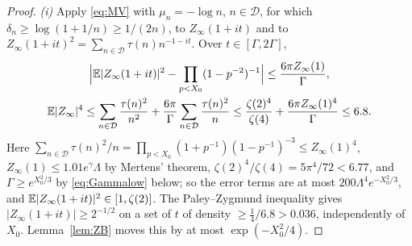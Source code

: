 \begin{proof}
\emph{(i)} Apply \eqref{eq:MV} with $\mu_n=-\log n$, $n\in\mathcal D$, for which $\delta_n\ge\log(1+1/n)\ge1/(2n)$, to $Z_\infty(1+it)$
and to $Z_\infty(1+it)^2=\sum_{n\in\mathcal D}\tau(n)n^{-1-it}$. Over $t\in[\Gamma,2\Gamma]$,
\[
\begin{gathered}
  \Bigl|\mathbb{E}|Z_\infty(1+it)|^2-\prod_{p<X_0}(1-p^{-2})^{-1}\Bigr|\le\frac{6\pi Z_\infty(1)}\Gamma,\\
  \mathbb{E}|Z_\infty|^4\le\sum_{n\in\mathcal D}\frac{\tau(n)^2}{n^2}+\frac{6\pi}\Gamma\sum_{n\in\mathcal D}\frac{\tau(n)^2}n
  \le\frac{\zeta(2)^4}{\zeta(4)}+\frac{6\pi Z_\infty(1)^4}\Gamma\le6.8.
\end{gathered}
\]
Here $\sum_{n\in\mathcal D}\tau(n)^2/n=\prod_{p<X_0}(1+p^{-1})(1-p^{-1})^{-3}\le Z_\infty(1)^4$, $Z_\infty(1)\le1.01e^{\gamma}\Lambda$ by
Mertens' theorem, $\zeta(2)^4/\zeta(4)=5\pi^4/72<6.77$, and $\Gamma\ge e^{X_0^2/3}$ by \eqref{eq:Gammalow} below; so the error terms are
at most $200\Lambda^4e^{-X_0^2/3}$, and $\mathbb{E}|Z_\infty(1+it)|^2\in[1,\zeta(2)]$. The Paley--Zygmund inequality gives
$|Z_\infty(1+it)|\ge2^{-1/2}$ on a set of $t$ of density $\ge\frac14/6.8>0.036$, independently of $X_0$. Lemma~\ref{lem:ZB} moves this by
at most $\exp(-X_0^2/4)$.


\end{proof}
